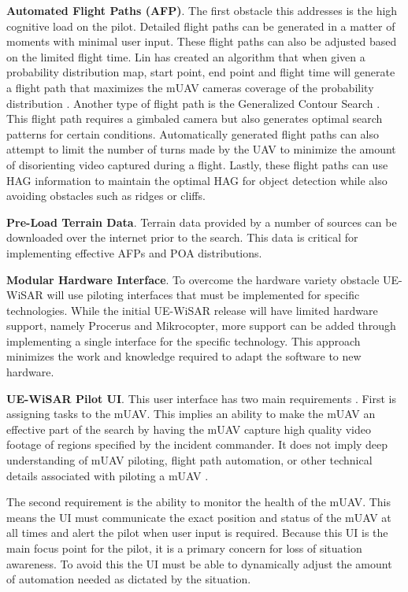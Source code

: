 \textbf{Automated Flight Paths (AFP)}.  The first obstacle this addresses is the
high cognitive load on the pilot.  Detailed flight paths can be generated in a matter of
moments with minimal user input.  These flight paths can also be adjusted based
on the limited flight time.  Lin has created an algorithm
that when given a probability distribution map, start point, end point and
flight time will generate a flight path that maximizes the mUAV cameras coverage
of the probability distribution \cite{lin2009uav}.  Another type of flight path
is the Generalized Contour Search \cite{goodrich2008supporting}.  This flight
path requires a gimbaled camera but also generates optimal search patterns for certain
conditions.  Automatically generated flight paths can also attempt to limit the
number of turns made by the UAV to minimize the amount of disorienting video
captured during a flight.  Lastly, these flight paths can use HAG information to
maintain the optimal HAG for object detection while also avoiding obstacles such
as ridges or cliffs.

\textbf{Pre-Load Terrain Data}.  Terrain data provided by a number of sources
can be downloaded over the internet prior to the search.  This data is critical for
implementing effective AFPs and POA distributions.

\textbf{Modular Hardware Interface}.  To overcome the hardware variety obstacle
UE-WiSAR will use piloting interfaces that must be implemented for specific technologies.
While the initial UE-WiSAR release will have limited hardware support, namely
Procerus and Mikrocopter, more support can be added through implementing a
single interface for the specific technology.  This approach minimizes the work and knowledge required to adapt
the software to new hardware.

\textbf{UE-WiSAR Pilot UI}.  This user interface has two main
requirements \cite{lin2010supporting}.  First is assigning tasks to the mUAV. 
This implies an ability to make the mUAV an effective part of the search by
having the mUAV capture high quality video footage of regions specified by the
incident commander.  It does not imply deep understanding of mUAV piloting,
flight path automation, or other technical details associated with piloting a
mUAV \cite{cooper2007supporting}.

The second requirement is the ability to monitor the health of the mUAV.
This means the UI must communicate the exact position and status of the mUAV at
all times and alert the pilot when user input is required.  Because this UI
is the main focus point for the pilot, it is a primary concern for loss of
situation awareness.  To avoid this the UI must be able to dynamically adjust
the amount of automation needed as dictated by the situation.

